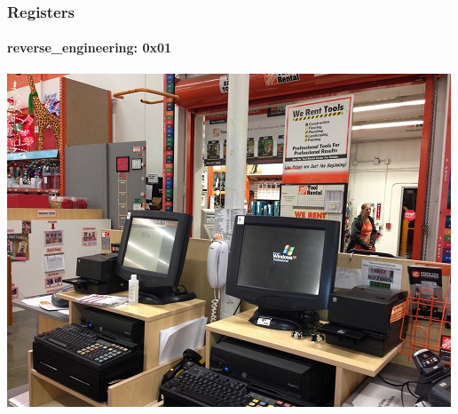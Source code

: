 \documentclass[aspectratio=169]{beamer}
\begin{document}
\begin{frame}
  \frametitle{Registers}
  \framesubtitle{reverse\_engineering: 0x01}
  \begin{center}
    \includegraphics[scale=0.5]{cash-register}
  \end{center}
\end{frame}
\end{document}
